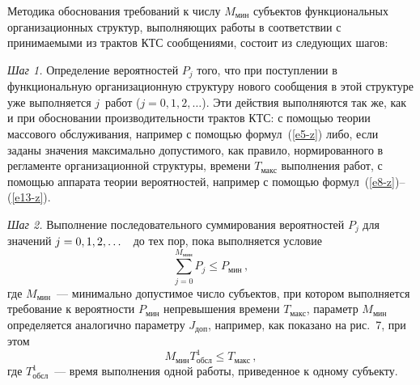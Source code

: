 \begin{multicols}{2}
     Методика обоснования требований к числу $M_{\mathrm{мин}}$ субъектов 
функциональных организационных структур, выполняющих работы в соответствии с 
принимаемыми из трактов КТС сообщениями, состоит из следующих шагов: 
     
\textit{Шаг 1.} Определение вероятностей $P_j$ того, что при поступлении в 
функциональную организационную структуру нового сообщения в этой структуре уже 
выполняется $j$~работ ($j = 0, 1, 2, \ldots$). Эти действия выполняются так же, как и при 
обосновании производительности трактов КТС: с по\-мощью теории массового 
обслуживания, например с по\-мощью формул~(\ref{e5-z}) либо, если заданы значения 
максимально допустимого, как правило, нормированного в регламенте организационной 
структуры, времени $T_{\mathrm{макс}}$ выполнения работ, с помощью аппарата теории 
вероятностей, например с помощью формул~(\ref{e8-z})--(\ref{e13-z}).

\textit{Шаг 2.} Выполнение последовательного суммирования вероятностей $P_j$ для 
значений $j \hm= 0, 1, 2, \ldots$\ \ до тех пор, пока выполняется условие
\begin{equation*}
\sum\limits_{j=0}^{M_{\mathrm{мин}}} P_j\leq P_{\mathrm{мин}}\,,
\end{equation*}
где $M_{\mathrm{мин}}$~--- минимально допустимое число субъектов, при котором 
выполняется требование к ве\-ро\-ят\-ности $P_{\mathrm{мин}}$ непревышения времени 
$T_{\mathrm{макс}}$, параметр $M_{\mathrm{мин}}$ определяется аналогично параметру 
$J_{\mathrm{доп}}$, например, как показано на рис.~7, при этом
\begin{equation*}
M_{\mathrm{мин}} T^1_{\mathrm{обсл}}\leq T_{\mathrm{макс}}\,,
\end{equation*}
где $T^1_{\mathrm{обсл}}$~--- время выполнения одной работы, приведенное к одному 
субъекту.


\begin{figure*} %
\vspace*{1pt}
\begin{center}
\mbox{%
\epsfxsize=121.081mm
}
\end{center}
\vspace*{-9pt}
\end{figure*}

\begin{figure*}[b] %
\vspace*{1pt}
\begin{center}
\mbox{%
\epsfxsize=162.26mm
}
\end{center}
\vspace*{-9pt}
\end{figure*}




\end{multicols}

